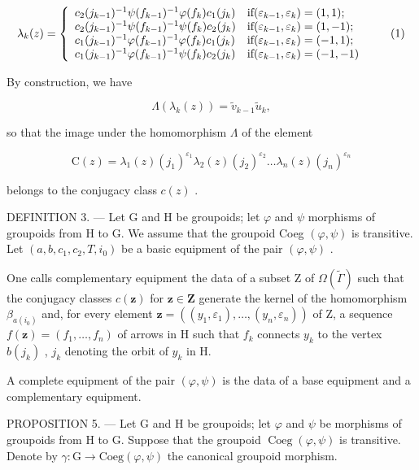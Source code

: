 \[
\lambda_ {k} (z) = \left\{ \begin{array}{l l} c _ {2} (j _ {k - 1}) ^ {- 1} \psi (f _ {k - 1}) ^ {- 1} \varphi (f _ {k}) c _ {1} (j _ {k}) & \text {if} (\varepsilon_ {k - 1}, \varepsilon_ {k}) = (1, 1); \\ c _ {2} (j _ {k - 1}) ^ {- 1} \psi (f _ {k - 1}) ^ {- 1} \psi (f _ {k}) c _ {2} (j _ {k}) & \text {if} (\varepsilon_ {k - 1}, \varepsilon_ {k}) = (1, - 1); \\ c _ {1} (j _ {k - 1}) ^ {- 1} \varphi (f _ {k - 1}) ^ {- 1} \varphi (f _ {k}) c _ {1} (j _ {k}) & \text {if} (\varepsilon_ {k - 1}, \varepsilon_ {k}) = (- 1, 1); \\ c _ {1} (j _ {k - 1}) ^ {- 1} \varphi (f _ {k - 1}) ^ {- 1} \psi (f _ {k}) c _ {2} (j _ {k}) & \text {if} (\varepsilon_ {k - 1}, \varepsilon_ {k}) = (- 1, - 1) \end{array} \right.\tag{1}
\]

By construction, we have

\[
\Lambda (\lambda_ {k} (z)) = \widetilde {v} _ {k - 1} \widetilde {u} _ {k},
\]

so that the image under the homomorphism \(\Lambda\) of the element

\[
\mathrm{C} (z) = \lambda_ {1} (z) (j _ {1}) ^ {\varepsilon_ {1}} \lambda_ {2} (z) (j _ {2}) ^ {\varepsilon_ {2}} \dots \lambda_ {n} (z) (j _ {n}) ^ {\varepsilon_ {n}}\tag{2}
\]

belongs to the conjugacy class \(c(z)\) .

DEFINITION 3. --- Let G and H be groupoids; let \(\varphi\) and \(\psi\) morphisms of groupoids from H to G. We assume that the groupoid Coeg \((\varphi, \psi)\) is transitive. Let \((a, b, c_1, c_2, T, i_0)\) be a basic equipment of the pair \((\varphi, \psi)\) .

One calls complementary equipment the data of a subset Z of \(\Omega(\widetilde{\Gamma})\) such that the conjugacy classes \(c(\mathbf{z})\) for \(\mathbf{z} \in \mathbf{Z}\) generate the kernel of the homomorphism \(\beta_{a(i_0)}\) and, for every element \(\mathbf{z} = ((y_1, \varepsilon_1), \ldots, (y_n, \varepsilon_n))\) of Z, a sequence \(f(\mathbf{z}) = (f_1, \ldots, f_n)\) of arrows in H such that \(f_k\) connects \(y_k\) to the vertex \(b(j_k)\) , \(j_k\) denoting the orbit of \(y_k\) in H.

A complete equipment of the pair \((\varphi,\psi)\) is the data of a base equipment and a complementary equipment.

PROPOSITION 5. --- Let G and H be groupoids; let \(\varphi\) and \(\psi\) be morphisms of groupoids from H to G. Suppose that the groupoid \(\operatorname{Coeg}(\varphi, \psi)\) is transitive. Denote by \(\gamma\colon \mathrm{G} \to \mathrm{Coeg}(\varphi, \psi)\) the canonical groupoid morphism.

